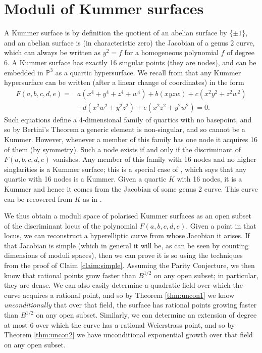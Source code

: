 \documentclass[a4paper,12pt]{amsart}
\begin{document}
\section{Moduli of Kummer surfaces}
A Kummer surface is by definition the quotient of an abelian surface by $\{\pm 1\}$, and an abelian surface is (in characteristic zero) the Jacobian of a genus 2 curve, which can always be written as $y^2 = f$ for a homogeneous polynomial $f$ of degree 6. A Kummer surface has exactly 16 singular points (they are nodes), and can be embedded in ${{\mathbb P}}^3$ as a quartic hypersurface. We recall from \cite[Page 352]{mumford_equations_1} that any Kummer hypersurface can be written (after a linear change of coordinates) in the form
\begin{equation*}
\begin{split}
F(a,b,c,d,e) = &a(x^4 + y^4 + z^4 + w^4)  +  b(xyzw) + c(x^2y^2 + z^2w^2) \\
& + d(x^2w^2 + y^2z^2) + e(x^2z^2 + y^2w^2) = 0. 
\end{split}
\end{equation*}
Such equations define a 4-dimensional family of quartics with no basepoint, and so by Bertini's Theorem a generic element is non-singular, and so cannot be a Kummer. However, whenever a member of this family has one node it acquires 16 of them (by symmetry). Such a node exists if and only if the discriminant of $F(a,b,c,d,e)$ vanishes. Any member of this family with 16 nodes and no higher singlarities is a Kummer surface; this is a special case of \cite[4.4]{elsenhans2009computation}, which says that any quartic with 16 nodes is a Kummer. 
Given a quartic $K$ with 16 nodes, it is a Kummer and hence it comes from the Jacobian of some genus 2 curve. This curve can be recovered from $K$ as in \cite[4.4]{elsenhans2009computation}. 

We thus obtain a moduli space of polarised Kummer surfaces as an open subset of the discriminant locus of the polynomial $F(a,b,c,d,e)$. Given a point in that locus, we can reconstruct a hyperelliptic curve from whose Jacobian it arises. If that Jacobian is simple  (which in general it will be, as can be seen by counting dimensions of moduli spaces), then we can prove it is so using the techniques from the proof of Claim \ref{claim:simple}. Assuming the Parity Conjecture, we then know that rational points grow faster than $B^{1/2}$ on any open subset; in particular, they are dense. We can also easily determine a quadratic field over which the curve acquires a rational point, and so by Theorem \ref{thm:uncon1} we know \emph{unconditionally} that over that field, the surface has rational points growing faster than $B^{1/2}$ on any open subset. Similarly, we can determine an extension of degree at most $6$ over which the curve has a rational Weierstrass point, and so by Theorem \ref{thm:uncon2} we have unconditional exponential growth over that field on any open subset. 
\end{document}

